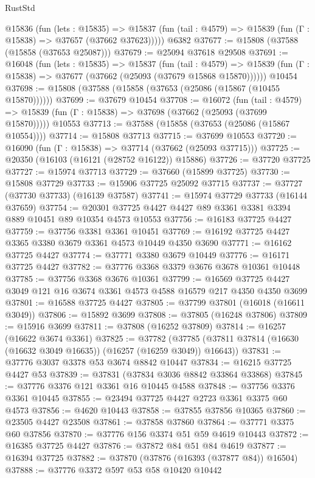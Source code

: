 \begin{lexlean}{RustStd}
\begin{coremodule}
    @15836
      (fun (lets : @15835) =>
      @15837 (fun (tail : @4579) => @15839 (fun (Γ : @15838) => @37657 (@37662 @37623)))))
    @6382
@37677 := @15808 (@37588 (@15858 (@37653 @25087)))
@37679 := @25094 @37618 @29508
@37691 := @16048
    (fun (lets : @15835) =>
    @15837
      (fun (tail : @4579) =>
      @15839 (fun (Γ : @15838) => @37677 (@37662 (@25093 (@37679 @15868 @15870))))))
    @10454
@37698 := @15808 (@37588 (@15858 (@37653 (@25086 (@15867 (@10455 @15870))))))
@37699 := @37679 @10454
@37708 := @16072
    (fun (tail : @4579) => @15839 (fun (Γ : @15838) => @37698 (@37662 (@25093 (@37699 @15870)))))
    @10553
@37713 := @37588 (@15858 (@37653 (@25086 (@15867 @10554))))
@37714 := @15808 @37713
@37715 := @37699 @10553
@37720 := @16090 (fun (Γ : @15838) => @37714 (@37662 (@25093 @37715)))
@37725 := @20350 (@16103 (@16121 (@28752 @16122)) @15886)
@37726 := @37720 @37725
@37727 := @15974 @37713
@37729 := @37660 (@15899 @37725)
@37730 := @15808 @37729
@37733 := @15906 @37725 @25092 @37715
@37737 := @37727 (@37730 @37733) (@16139 @37587)
@37741 := @15974 @37729 @37733 (@16144 @37659)
@37754 := @20301 @37725 @4427 @4427 @89 @3361 @3381 @3394 @889 @10451 @89 @10354 @4573 @10553
@37756 := @16183 @37725 @4427
@37759 := @37756 @3381 @3361 @10451
@37769 := @16192 @37725 @4427 @3365 @3380 @3679 @3361 @4573 @10449 @4350 @3690
@37771 := @16162 @37725 @4427
@37774 := @37771 @3380 @3679 @10449
@37776 := @16171 @37725 @4427
@37782 := @37776 @3368 @3379 @3676 @3678 @10361 @10448
@37785 := @37756 @3368 @3676 @10361
@37799 := @16569 @37725 @4427 @3049 @121 @16 @3674 @3361 @4573 @4588 @16579 @217 @4350 @4350 @3699
@37801 := @16588 @37725 @4427
@37805 := @37799 @37801 (@16018 (@16611 @3049))
@37806 := @15892 @3699
@37808 := @37805 (@16248 @37806)
@37809 := @15916 @3699
@37811 := @37808 (@16252 @37809)
@37814 := @16257 (@16622 @3674 @3361)
@37825 := @37782
    (@37785 (@37811 @37814 (@16630 (@16632 @3049 @16635)) (@16257 (@16259 @3049)) @16643))
@37831 := @37776 @3037 @3378 @53 @3674 @8842 @10447
@37834 := @16215 @37725 @4427 @53
@37839 := @37831 (@37834 @3036 @8842 @33864 @33868)
@37845 := @37776 @3376 @121 @3361 @16 @10445 @4588
@37848 := @37756 @3376 @3361 @10445
@37855 := @23494 @37725 @4427 @2723 @3361 @3375 @60 @4573
@37856 := @4620 @10443
@37858 := @37855 @37856 @10365
@37860 := @23505 @4427 @23508
@37861 := @37858 @37860
@37864 := @37771 @3375 @60 @37856
@37870 := @37776 @156 @3374 @51 @59 @4619 @10443
@37872 := @16385 @37725 @4427
@37876 := @37872 @84 @51 @84 @4619
@37877 := @16394 @37725
@37882 := @37870 (@37876 (@16393 (@37877 @84)) @16504)
@37888 := @37776 @3372 @597 @53 @58 @10420 @10442

\end{coremodule}
\end{lexlean}
